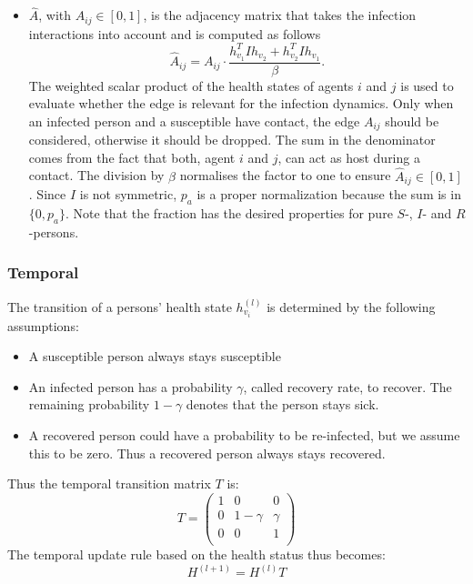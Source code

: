 \begin{itemize}
\begin{itemize}
		\item $\hat{A}$, with $\hat{A}_{ij}\in [0, 1]$, is the adjacency matrix that takes the infection interactions into account and is computed as follows
		\begin{equation}
		\hat{A}_{ij} = A_{ij}\cdot \frac{ h_{v_1}^T I h_{v_2} + h_{v_2}^T I h_{v_1} }{\beta}.
		\end{equation}
		The weighted scalar product of the health states of agents $i$ and $j$ is used to evaluate whether the edge is relevant for the infection dynamics. Only when an infected person and a susceptible have contact, the edge $A_{ij}$ should be considered, otherwise it should be dropped.	The sum in the denominator comes from the fact that both, agent $i$ and $j$, can act as host during a contact. The division by $\beta$ normalises the factor to one to ensure $\hat{A}_{ij} \in [0, 1]$. Since $I$ is not symmetric, $p_a$ is a proper normalization because the sum is in $\{0, p_a\}$. Note that the fraction has the desired properties for pure $S$-, $I$- and $R$-persons.
	\end{itemize}
\end{itemize}


\subsubsection{Temporal}
The transition of a persons' health state $h_{v_i}^{(l)}$ is determined by the following assumptions:
\begin{itemize}
	\item A susceptible person always stays susceptible
	\item An infected person has a probability $\gamma$, called recovery rate, to recover. The remaining probability $1-\gamma$ denotes that the person stays sick.
	\item A recovered person could have a probability to be re-infected, but we assume this to be zero. Thus a recovered person always stays recovered.
\end{itemize}
Thus the temporal transition matrix $T$ is:
\begin{equation}
T = 
\begin{pmatrix}
1 &     0    & 0      \\
0 & 1-\gamma & \gamma \\
0 &     0    & 1      \\
\end{pmatrix}
\end{equation}
The temporal update rule based on the health status thus becomes:
\begin{equation}
H^{(l+1)} = H^{(l)} T
\end{equation}